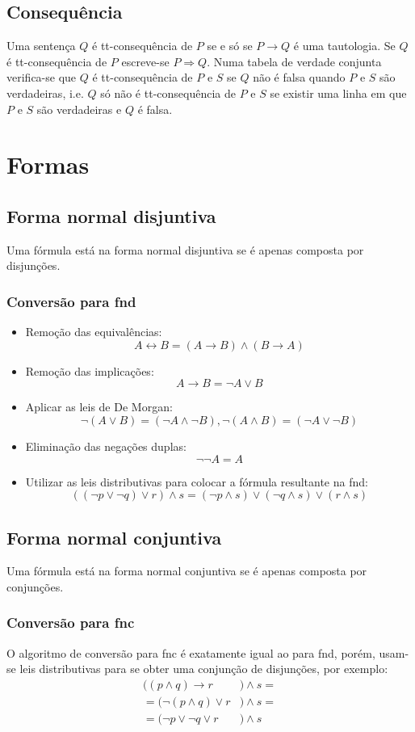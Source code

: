 \documentclass[10pt,a4paper]{report}
\begin{document}
\section{Consequência}
Uma sentença $Q$ é tt-consequência de $P$ se e só se $P \rightarrow Q$ é uma tautologia. Se $Q$ é tt-consequência de $P$ escreve-se $P \Rightarrow Q$. Numa tabela de verdade conjunta verifica-se que $Q$ é tt-consequência de $P$ e $S$ se $Q$ não é falsa quando $P$ e $S$ são verdadeiras, i.e. $Q$ só não é tt-consequência de $P$ e $S$ se existir uma linha em que  $P$ e $S$ são verdadeiras e $Q$ é falsa.

\chapter{Formas}
\section{Forma normal disjuntiva}
Uma fórmula está na forma normal disjuntiva se é apenas composta por disjunções.
\subsection{Conversão para fnd}
\begin{itemize}
\item Remoção das equivalências:
$$
A \leftrightarrow B = (A \rightarrow B) \land (B \rightarrow A)
$$
\item Remoção das implicações:
$$
A \rightarrow B = \neg A \lor B
$$
\item Aplicar as leis de De Morgan:
$$
\neg(A \lor B) = (\neg A \land \neg B), \neg(A \land B) = (\neg A \lor \neg B)
$$
\item Eliminação das negações duplas:
$$
\neg \neg A = A
$$
\item Utilizar as leis distributivas para colocar a fórmula resultante na fnd:
$$
((\neg p \lor \neg q) \lor r) \land s = (\neg p \land s) \lor (\neg q \land s) \lor(r \land s) 
$$
\end{itemize}
\section{Forma normal conjuntiva}
Uma fórmula está na forma normal conjuntiva se é apenas composta por conjunções.
\subsection{Conversão para fnc}
O algoritmo de conversão para fnc é exatamente igual ao para fnd, porém, usam-se leis
distributivas para se obter uma conjunção de disjunções, por exemplo:
\begin{align}
((p \land q) \rightarrow r&) \land s =\\
=(\neg(p \land q) \lor r&) \land s =\\
=(\neg p \lor \neg q \lor r&) \land s
\end{align}
\end{document}
